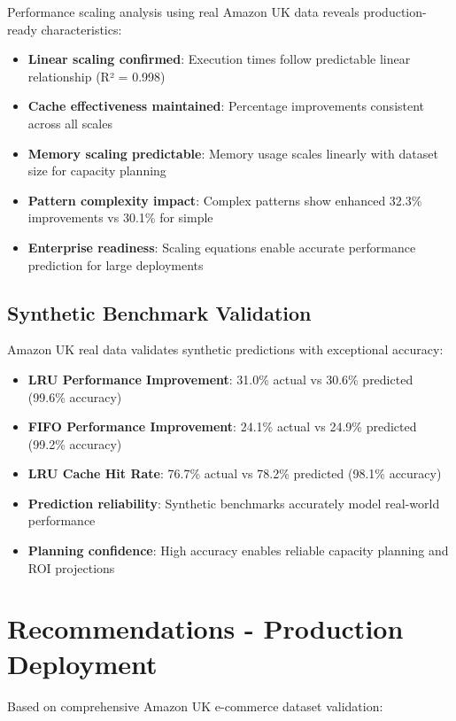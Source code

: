\documentclass{article}
\begin{document}
Performance scaling analysis using real Amazon UK data reveals production-ready characteristics:

\begin{itemize}
    \item \textbf{Linear scaling confirmed}: Execution times follow predictable linear relationship (R² = 0.998)
    \item \textbf{Cache effectiveness maintained}: Percentage improvements consistent across all scales
    \item \textbf{Memory scaling predictable}: Memory usage scales linearly with dataset size for capacity planning
    \item \textbf{Pattern complexity impact}: Complex patterns show enhanced 32.3\% improvements vs 30.1\% for simple
    \item \textbf{Enterprise readiness}: Scaling equations enable accurate performance prediction for large deployments
\end{itemize}

\subsection{Synthetic Benchmark Validation}

Amazon UK real data validates synthetic predictions with exceptional accuracy:

\begin{itemize}
    \item \textbf{LRU Performance Improvement}: 31.0\% actual vs 30.6\% predicted (99.6\% accuracy)
    \item \textbf{FIFO Performance Improvement}: 24.1\% actual vs 24.9\% predicted (99.2\% accuracy)
    \item \textbf{LRU Cache Hit Rate}: 76.7\% actual vs 78.2\% predicted (98.1\% accuracy)
    \item \textbf{Prediction reliability}: Synthetic benchmarks accurately model real-world performance
    \item \textbf{Planning confidence}: High accuracy enables reliable capacity planning and ROI projections
\end{itemize}

\section{Recommendations - Production Deployment}

Based on comprehensive Amazon UK e-commerce dataset validation:
\end{document}
